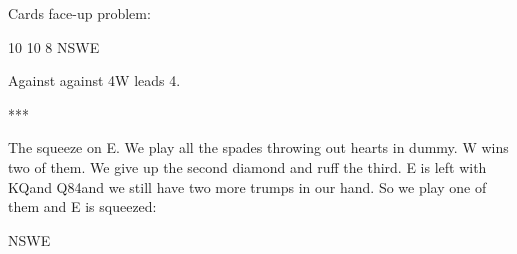 \documentclass[12pt, a4paper]{article}
\begin{document}
Cards face-up problem:

        {}{10}
        {}{10}
        {}{8}
        {NSWE}


Against against 4\spades W leads 4\diams.
\begin{center}
    ***
\end{center}

The \twosuit{\clubs}{\diams} squeeze on E.
We play all the spades throwing out hearts in dummy.
W wins two of them. We give up the
second diamond and ruff the third. E is left
with KQ\diams and Q84\clubs and we still have two
more trumps in our hand. So we play one of them and
E is squeezed:

        {}{}
        {}{}
        {}{}
        {NSWE}
\end{document}
